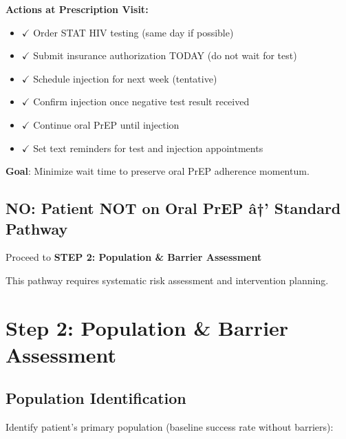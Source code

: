 \documentclass[11pt]{article}
\begin{document}
\begin{tcolorbox}[colback=green!10!white,colframe=green!75!black,title=\textbf{Secondary Question: Recent HIV Test?},breakable]
\begin{tcolorbox}[colback=green!15!white,colframe=green!75!black,title=* PRIORITY 2: Rapid Transition Protocol]
\textbf{Actions at Prescription Visit:}
\begin{itemize}[leftmargin=*]
\item $\checkmark$ Order STAT HIV testing (same day if possible)
\item $\checkmark$ Submit insurance authorization TODAY (do not wait for test)
\item $\checkmark$ Schedule injection for next week (tentative)
\item $\checkmark$ Confirm injection once negative test result received
\item $\checkmark$ Continue oral PrEP until injection
\item $\checkmark$ Set text reminders for test and injection appointments
\end{itemize}

\textbf{Goal}: Minimize wait time to preserve oral PrEP adherence momentum.
\end{tcolorbox}
\end{tcolorbox}

\subsection{NO: Patient NOT on Oral PrEP â†’ Standard Pathway}

\begin{tcolorbox}[colback=orange!10!white,colframe=orange!75!black]
Proceed to \textbf{STEP 2: Population \& Barrier Assessment}

This pathway requires systematic risk assessment and intervention planning.
\end{tcolorbox}

\section{Step 2: Population \& Barrier Assessment}

\subsection{Population Identification}

Identify patient's primary population (baseline success rate without barriers):
\end{document}
